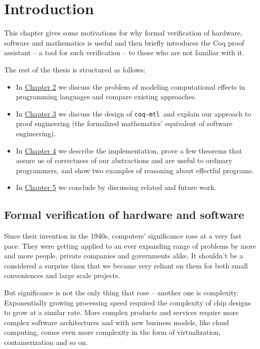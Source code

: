 \documentclass[declaration,inz,english,shortabstract]{iithesis}
\author         {Wojciech Kołowski}
\date           {10 września 2019}                     %
\newcommand{\libname}{\m{coq-mtl}}
\newcommand{\m}[1]{\texttt{#1}}
\begin{document}

\chapter{Introduction} \label{ch1}

This chapter gives some motivations for why formal verification of hardware, software and mathematics is useful and then briefly introduces the Coq proof assistant -- a tool for such verification -- to those who are not familiar with it.

The rest of the thesis is structured as follows:

\begin{itemize}
    \item In \hyperref[ch2]{Chapter 2} we discuss the problem of modeling computational effects in programming languages and compare existing approaches.
    \item In \hyperref[ch3]{Chapter 3} we discuss the design of \libname\ and explain our approach to proof engineering (the formalized mathematics' equivalent of software engineering).
    \item In \hyperref[ch4]{Chapter 4} we describe the implementation, prove a few theorems that assure us of correctness of our abstractions and are useful to ordinary programmers, and show two examples of reasoning about effectful programs.
    \item In \hyperref[ch5]{Chapter 5} we conclude by discussing related and future work.
\end{itemize}

\section{Formal verification of hardware and software}

Since their invention in the 1940s, computers' significance rose at a very fast pace. They were getting applied to an ever expanding range of problems by more and more people, private companies and governments alike. It shouldn't be a considered a surprise then that we became very reliant on them for both small conveniences and large scale projects.

But significance is not the only thing that rose -- another one is complexity. Exponentially growing processing speed required the complexity of chip designs to grow at a similar rate. More complex products and services require more complex software architectures and with new business models, like cloud computing, comes even more complexity in the form of virtualization, containerization and so on.
\end{document}

